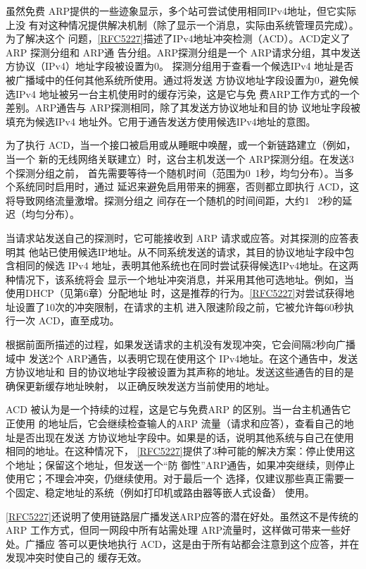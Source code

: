 虽然免费 ARP提供的一些迹象显示，多个站可尝试使用相同IPv4地址，但它实际上没
有对这种情况提供解决机制（除了显示一个消息，实际由系统管理员完成）。为了解决这个
问题，\href{https://www.rfc-editor.org/rfc/rfc5227}{[RFC5227]}描述了IPv4地址冲突检测（ACD）。ACD定义了
ARP 探测分组和 ARP通
告分组。ARP探测分组是一个 ARP请求分组，其中发送方协议（IPv4）地址字段被设置为0。
探测分组用于查看一个候选IPv4 地址是否被广播域中的任何其他系统所使用。通过将发送
方协议地址字段设置为0，避免候选IPv4 地址被另一台主机使用时的缓存污染，这是它与免
费ARP工作方式的一个差别。ARP通告与 ARP探测相同，除了其发送方协议地址和目的协
议地址字段被填充为候选IPv4 地址外。它用于通告发送方使用候选IPv4地址的意图。

为了执行 ACD，当一个接口被启用或从睡眠中唤醒，或一个新链路建立（例如，当一个
新的无线网络关联建立）时，这台主机发送一个 ARP探测分组。在发送3个探测分组之前，
首先需要等待一个随机时间（范围为0~1秒，均匀分布）。当多个系统同时启用时，通过
延迟来避免启用带来的拥塞，否则都立即执行 ACD，这将导致网络流量激增。探测分组之
间存在一个随机的时间间距，大约1 ~2秒的延迟（均匀分布）。

当请求站发送自己的探测时，它可能接收到 ARP 请求或应答。对其探测的应答表明其
他站已使用候选IP地址。从不同系统发送的请求，其目的协议地址字段中包含相同的候选
IPv4 地址，表明其他系统也在同时尝试获得候选IPv4地址。在这两种情况下，该系统将会
显示一个地址冲突消息，并采用其他可选地址。例如，当使用DHCP（见第6章）分配地址
时，这是推荐的行为。\href{https://www.rfc-editor.org/rfc/rfc5227}{[RFC5227]}对尝试获得地址设置了10次的冲突限制，在请求的主机
进入限速阶段之前，它被允许每60秒执行一次 ACD，直至成功。

根据前面所描述的过程，如果发送请求的主机没有发现冲突，它会间隔2秒向广播域中
发送2个 ARP通告，以表明它现在使用这个 IPv4地址。在这个通告中，发送方协议地址和
目的协议地址字段被设置为其声称的地址。发送这些通告的目的是确保更新缓存地址映射，
以正确反映发送方当前使用的地址。

ACD 被认为是一个持续的过程，这是它与免费ARP 的区别。当一台主机通告它正使用
的地址后，它会继续检查输人的ARP 流量（请求和应答），查看自己的地址是否出现在发送
方协议地址字段中。如果是的话，说明其他系统与自己在使用相同的地址。在这种情况下，
\href{https://www.rfc-editor.org/rfc/rfc5227}{[RFC5227]}提供了3种可能的解决方案：停止使用这个地址；保留这个地址，但发送一个“防
御性”ARP通告，如果冲突继续，则停止使用它；不理会冲突，仍继续使用。对于最后一个
选择，仅建议那些真正需要一个固定、稳定地址的系统（例如打印机或路由器等嵌人式设备）
使用。

\href{https://www.rfc-editor.org/rfc/rfc5227}{[RFC5227]}还说明了使用链路层广播发送ARP应答的潜在好处。虽然这不是传统的
ARP 工作方式，但同一网段中所有站需处理 ARP流量时，这样做可带来一些好处。广播应
答可以更快地执行 ACD，这是由于所有站都会注意到这个应答，并在发现冲突时使自己的
缓存无效。

